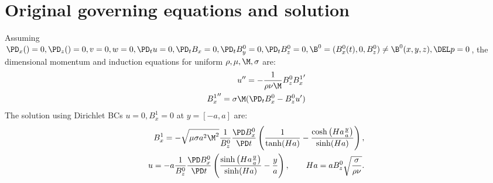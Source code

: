 \documentclass[11pt]{article}
\begin{document}
\doublespacing
\MOONSTITLE
\maketitle

\section{Original governing equations and solution}
Assuming $\PD_x () =0, \PD_z () = 0, v=0,w=0, \PD_t u = 0, \PD_t B_x = 0,\PD_t B_y^0 = 0, \PD_t B_z^0 = 0,\B^0 = (B_x^0(t),0,B_z^0) \ne \B^0(x,y,z), \DEL p =0$, the dimensional momentum and induction equations for uniform $\rho,\mu,\M,\sigma$ are:
\begin{equation}\begin{aligned}
u''   = - \frac{1}{\rho \nu \M} B_z^0 {B_x^1}' \\
{B_x^1}'' = \sigma \M (\PD_t B_x^0 - B_z^0 u') \\
\end{aligned} \end{equation}
\noindent
The solution using Dirichlet BCs $u=0,B_x^1 = 0$ at $y=[-a,a]$ are:
\begin{equation}\begin{aligned}
B_x^1 = - \sqrt{\mu \sigma a^2 \M^2} \frac{1}{B_z^0} \frac{\PD B_x^0}{\PD t} \left( \frac{1}{\tanh(Ha)} -  \frac{\cosh \left(Ha \frac{y}{a} \right)}{\sinh(Ha)}\right), \\
u   = -a \frac{1}{B_z^0} \frac{\PD B_x^0}{\PD t} \left( \frac{\sinh\left(Ha \frac{y}{a} \right)}{\sinh(Ha)} - \frac{y}{a} \right), \qquad
Ha = a B_z^0 \sqrt{\frac{\sigma}{\rho \nu}}. \\
\end{aligned} \end{equation}
\end{document}
